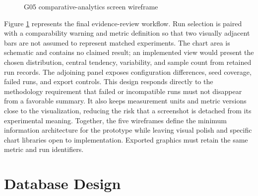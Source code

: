 \begin{figure}[htbp]
\centering
{}
\caption{G05 comparative-analytics screen wireframe}
\label{fig:wire-analytics}
\end{figure}

Figure \ref{fig:wire-analytics} represents the final evidence-review workflow. Run selection is paired with a comparability warning and metric definition so that two visually adjacent bars are not assumed to represent matched experiments. The chart area is schematic and contains no claimed result; an implemented view would present the chosen distribution, central tendency, variability, and sample count from retained run records. The adjoining panel exposes configuration differences, seed coverage, failed runs, and export controls. This design responds directly to the methodology requirement that failed or incompatible runs must not disappear from a favorable summary. It also keeps measurement units and metric versions close to the visualization, reducing the risk that a screenshot is detached from its experimental meaning. Together, the five wireframes define the minimum information architecture for the prototype while leaving visual polish and specific chart libraries open to implementation. Exported graphics must retain the same metric and run identifiers.

\section{Database Design}
\label{sec:data-design}

